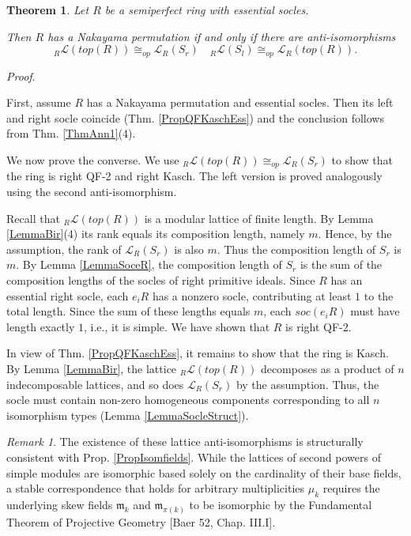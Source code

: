 \documentclass[11pt]{article}
\theoremstyle{plain}
\newtheorem{Thm}[veta]{Theorem}
\theoremstyle{remark}
\newtheorem*{remark}{Remark}
\theoremstyle{plain}
\newenvironment{Proof}{
  \par\medskip\noindent
  \textit{Proof}.
}{
\newline
\rightline{$\qedsymbol$}
}
\newcommand{\m}{\mathfrak{m}}
\begin{document}
\begin{Thm}\label{ThmAnti-isom}
Let $R$ be a semiperfect ring with essential socles. 

Then $R$ has a Nakayama permutation if and only if there are anti-isomorphisms  \[ {}_R\mathcal{L}(top(R)) \cong_{op} \mathcal{L}_R(S_r)\quad  {}_R\mathcal{L}(S_l) \cong_{op} \mathcal{L}_R(top(R)).\]
\end{Thm}
\begin{Proof}
First, assume $R$ has a Nakayama permutation and essential socles. Then its left and right socle coincide (Thm. \ref{PropQFKaschEss}) and the conclusion follows from Thm. \ref{ThmAnn1}(4). 



We now prove the converse. We use ${}_R\mathcal{L}(top(R)) \cong_{op} \mathcal{L}_R(S_r)$ to show that the ring is right QF-2 and right Kasch. The left version is proved analogously using the second anti-isomorphism. 

Recall that $_R\mathcal{L}(top(R))$ is a modular lattice of finite length. By Lemma \ref{LemmaBir}(4) its rank equals its composition length, namely $m$. Hence, by the assumption, the rank of $\mathcal{L}_R(S_r)$ is also $m$. Thus the composition length of $S_r$ is $m$. By Lemma \ref{LemmaSoceR},  the composition length of $S_r$ is the sum of the composition lengths of the socles of right primitive ideals.  Since $R$ has an essential right socle, each $e_iR$ has a nonzero socle, contributing at least $1$ to the total length. Since the sum of these lengths equals $m$, each $soc(e_iR)$ must have length exactly $1$, i.e., it is simple. We have shown that $R$ is right QF-2. 

In view of Thm. \ref{PropQFKaschEss}, it remains to show that the ring is Kasch. By Lemma \ref{LemmaBir}, the lattice $_R\mathcal{L}(top(R))$ decomposes as a product of $n$ indecomposable lattices, and so does $\mathcal{L}_R(S_r)$  by the assumption. Thus, the socle must contain non-zero homogeneous components corresponding to all $n$ isomorphism types (Lemma \ref{LemmaSocleStruct}).
\end{Proof}
\begin{remark}
    The existence of these lattice anti-isomorphisms is structurally consistent with Prop. \ref{PropIsomfields}. While the lattices of second powers of simple modules are isomorphic based solely on the cardinality of their base fields, a stable correspondence that holds for arbitrary multiplicities $\mu_k$ requires the underlying skew fields $\m_k$ and $\m_{\pi(k)}$ to be isomorphic by the Fundamental Theorem of Projective Geometry [Baer 52, Chap. III.I].
\end{remark}
\end{document}
